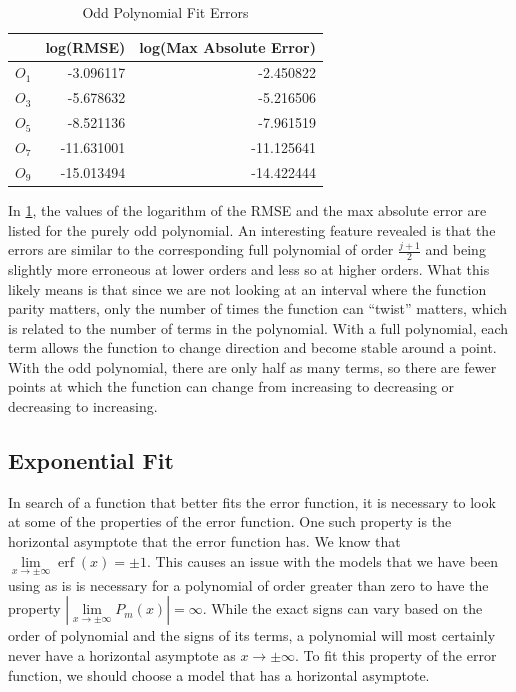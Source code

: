 \documentclass[10pt,a4paper]{article}
\DeclareMathOperator\erf{erf}
\begin{document}
\begin{table}[H]
\centering
\begin{tabular}{l|rr}
     & \multicolumn{1}{c}{log(RMSE)} & \multicolumn{1}{c}{log(Max Absolute Error)} \\ \hline
$O_1$ & -3.096117             & -2.450822                           \\
$O_3$ & -5.678632            & -5.216506                           \\
$O_5$ & -8.521136            & -7.961519                           \\
$O_7$ & -11.631001           & -11.125641                          \\
$O_9$ & -15.013494             & -14.422444                          
\end{tabular}
\caption{Odd Polynomial Fit Errors}
\label{table: odderrors}
\end{table}

In \cref{table: odderrors}, the values of the logarithm of the RMSE and the max absolute error are listed for the purely odd polynomial. An interesting feature revealed is that the errors are similar to the corresponding full polynomial of order $\frac{j+1}{2}$ and being slightly more erroneous at lower orders and less so at higher orders. What this likely means is that since we are not looking at an interval where the function parity matters, only the number of times the function can ``twist'' matters, which is related to the number of terms in the polynomial. With a full polynomial, each term allows the function to change direction and become stable around a point. With the odd polynomial, there are only half as many terms, so there are fewer points at which the function can change from increasing to decreasing or decreasing to increasing.

\subsection*{Exponential Fit}

In search of a function that better fits the error function, it is necessary to look at some of the properties of the error function. One such property is the horizontal asymptote that the error function has. We know that $\lim\limits_{x \to \pm \infty} \erf{(x)} = \pm1$. This causes an issue with the models that we have been using as is is necessary for a polynomial of order greater than zero to have the property $\left| \lim\limits_{x \to \pm \infty} P_m(x)  \right| = \infty$. While the exact signs can vary based on the order of polynomial and the signs of its terms, a polynomial will most certainly never have a horizontal asymptote as $x \to \pm \infty$. To fit this property of the error function, we should choose a model that has a horizontal asymptote.
\end{document}

